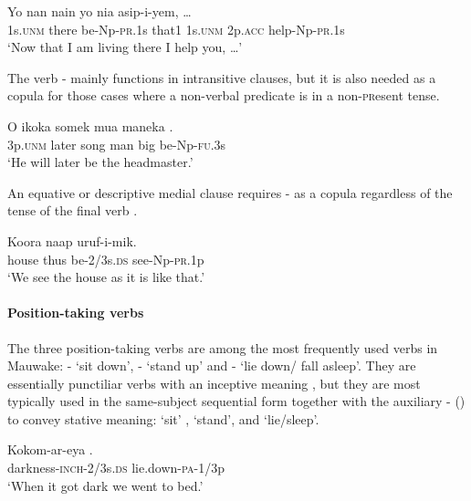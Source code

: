 \ea%
\label{ex:3:x265}
\gll Yo nan  nain yo nia asip-i-yem, {\dots} \\
1s.\textsc{unm} there be-Np-\textsc{pr}.1s that1 1s.\textsc{unm} 2p.\textsc{acc} help-Np-\textsc{pr}.1s\\
\glt`Now that I am living there I help you, {\dots}'
\z

The verb - mainly functions in intransitive clauses, but it is also needed as a copula for those cases where a non-verbal predicate is in a non-\textsc{pr}esent tense. 

\ea%
\label{ex:3:x969}
\gll O ikoka somek mua maneka . \\
3p.\textsc{unm} later song man big be-Np-\textsc{fu}.3s\\
\glt`He will later be the headmaster.'
\z

An equative or descriptive medial clause requires - as a copula regardless of the tense of the final verb .

\ea%
\label{ex:3:x498}
\gll Koora naap  uruf-i-mik. \\
house thus be-2/3s.\textsc{ds} see-Np-\textsc{pr}.1p\\
\glt`We see the house as it is like that.'
\z

\paragraph{Position-taking verbs}\label{sec:3.8.4.4.2}
{}
The three position-taking verbs are among the most frequently used verbs in Mauwake: - `sit down', - `stand up' and - `lie down/ fall asleep'. They are essentially punctiliar verbs with an inceptive meaning , but they are most typically used in the same-subject sequential form together with the auxiliary - () to convey stative meaning: `sit' , `stand', and `lie/sleep'.

\ea%
\label{ex:3:x273}
\gll Kokom-ar-eya . \\
darkness-\textsc{inch}-2/3s.\textsc{ds} lie.down-\textsc{pa}-1/3p \\
\glt`When it got dark we went to bed.'
\z

